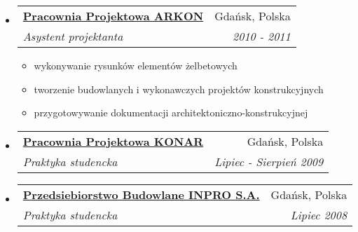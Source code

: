 \documentclass[letterpaper,11pt]{article}
\makeatletter
\newcommand{\resitem}[1]{\item #1 \vspace{-2pt}}
\newcommand{\ressubheading}[4]{
\begin{tabular*}{6.5in}{l@{\extracolsep{\fill}}r}
		\textbf{#1} & #2 \\
		\textit{#3} & \textit{#4} \\
\end{tabular*}\vspace{-6pt}}
\makeatother
\begin{document}
\begin{itemize}
\item
  \ressubheading{\href{http://www.konar.eu/}{Pracownia Projektowa ARKON}}{Gdańsk, Polska}{Asystent projektanta}{2010 - 2011}
  \begin{itemize}
    \resitem{wykonywanie rysunków elementów żelbetowych}
    \resitem{tworzenie budowlanych i wykonawczych projektów konstrukcyjnych}
    \resitem{przygotowywanie dokumentacji architektoniczno-konstrukcyjnej}
  \end{itemize}
  
\item
  \ressubheading{\href{http://www.konar.eu/}{Pracownia Projektowa KONAR}}{Gdańsk, Polska}{Praktyka studencka}{Lipiec - Sierpień 2009}

\item
  \ressubheading{\href{https://www.inpro.com.pl}{Przedsiebiorstwo Budowlane INPRO S.A.}}{Gdańsk, Polska}{Praktyka studencka}{Lipiec 2008}

\end{itemize}

\end{document}

